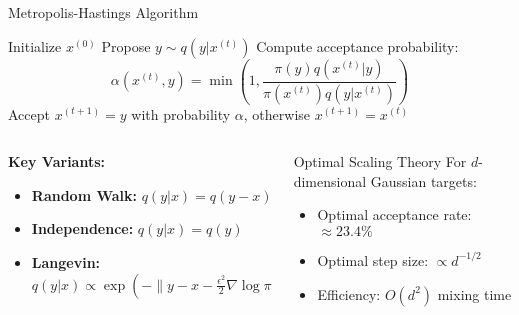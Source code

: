 \documentclass[aspectratio=169,11pt]{beamer}
\begin{document}
\begin{frame}{Metropolis-Hastings Algorithm}
\begin{algorithm}[H]
\caption{Metropolis-Hastings}
\begin{algorithmic}[1]
\STATE Initialize $x^{(0)}$
\STATE Propose $y \sim q(y | x^{(t)})$
\STATE Compute acceptance probability:
\[
\alpha(x^{(t)}, y) = \min\left(1, \frac{\pi(y) q(x^{(t)} | y)}{\pi(x^{(t)}) q(y | x^{(t)})}\right)
\]
\STATE Accept $x^{(t+1)} = y$ with probability $\alpha$, otherwise $x^{(t+1)} = x^{(t)}$
\ENDFOR
\end{algorithmic}
\end{algorithm}

\begin{columns}
\begin{column}{0.5\textwidth}
\textbf{Key Variants:}
\begin{itemize}
\item \textbf{Random Walk:} $q(y|x) = q(y-x)$
\item \textbf{Independence:} $q(y|x) = q(y)$
\item \textbf{Langevin:} $q(y|x) \propto \exp(-\|y-x-\frac{\epsilon^2}{2}\nabla\log\pi(x)\|^2/(2\epsilon^2))$
\end{itemize}
\end{column}
\begin{column}{0.5\textwidth}
\begin{block}{Optimal Scaling Theory}
For $d$-dimensional Gaussian targets:
\begin{itemize}
\item Optimal acceptance rate: $\approx 23.4\%$
\item Optimal step size: $\propto d^{-1/2}$
\item Efficiency: $O(d^2)$ mixing time
\end{itemize}
\end{block}
\end{column}
\end{columns}
\end{frame}
\end{document}
